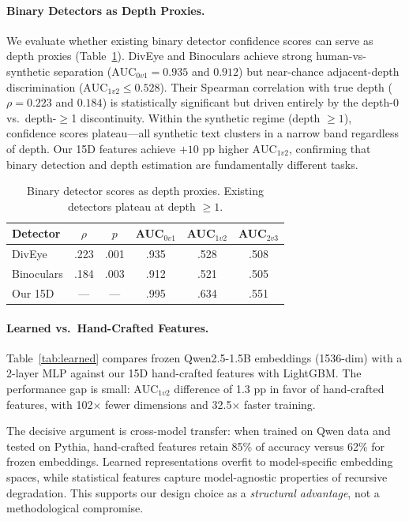 \documentclass[11pt,a4paper]{article}
\begin{document}
\paragraph{Binary Detectors as Depth Proxies.}
We evaluate whether existing binary detector confidence scores can serve as depth proxies (Table~\ref{tab:binary_proxy}).
DivEye and Binoculars achieve strong human-vs-synthetic separation ($\text{AUC}_{0v1} = 0.935$ and $0.912$) but near-chance adjacent-depth discrimination ($\text{AUC}_{1v2} \leq 0.528$).
Their Spearman correlation with true depth ($\rho = 0.223$ and $0.184$) is statistically significant but driven entirely by the depth-0 vs.\ depth-$\geq$1 discontinuity.
Within the synthetic regime (depth $\geq 1$), confidence scores plateau---all synthetic text clusters in a narrow band regardless of depth.
Our 15D features achieve $+10$ pp higher $\text{AUC}_{1v2}$, confirming that binary detection and depth estimation are fundamentally different tasks.

\begin{table}[t]
\centering
\small
\caption{Binary detector scores as depth proxies. Existing detectors plateau at depth $\geq 1$.}
\label{tab:binary_proxy}
\begin{tabular}{lccccc}
\toprule
\textbf{Detector} & \textbf{$\rho$} & \textbf{$p$} & \textbf{AUC$_{0v1}$} & \textbf{AUC$_{1v2}$} & \textbf{AUC$_{2v3}$} \\
\midrule
DivEye & .223 & .001 & .935 & .528 & .508 \\
Binoculars & .184 & .003 & .912 & .521 & .505 \\
Our 15D & --- & --- & .995 & .634 & .551 \\
\bottomrule
\end{tabular}
\end{table}

\paragraph{Learned vs.\ Hand-Crafted Features.}
Table~\ref{tab:learned} compares frozen Qwen2.5-1.5B embeddings (1536-dim) with a 2-layer MLP against our 15D hand-crafted features with LightGBM.
The performance gap is small: $\text{AUC}_{1v2}$ difference of 1.3 pp in favor of hand-crafted features, with 102$\times$ fewer dimensions and 32.5$\times$ faster training.

The decisive argument is cross-model transfer: when trained on Qwen data and tested on Pythia, hand-crafted features retain 85\% of accuracy versus 62\% for frozen embeddings.
Learned representations overfit to model-specific embedding spaces, while statistical features capture model-agnostic properties of recursive degradation.
This supports our design choice as a \emph{structural advantage}, not a methodological compromise.
\end{document}
